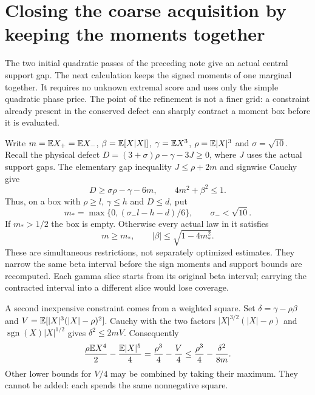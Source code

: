 \section{Closing the coarse acquisition by keeping the moments together}
\label{v7:signed}
The two initial quadratic passes of the preceding note give an actual
central support gap. The next calculation keeps the signed moments of
one marginal together. It requires no unknown extremal score and uses
only the simple quadratic phase price. The point of the refinement is
not a finer grid: a constraint already present in the conserved defect
can sharply contract a moment box before it is evaluated.

Write $m=\mathbb E X_+=\mathbb E X_-$, $\beta=\mathbb E[X|X|]$, $\gamma=\mathbb E X^3$,
$\rho=\mathbb E|X|^3$ and $\sigma=\sqrt{10}$. Recall the physical defect
$D=(3+\sigma)\rho-\gamma-3J\ge0$, where $J$ uses the actual support gaps.
The elementary gap inequality $J\le\rho+2m$ and signwise Cauchy give
\begin{equation}\label{v7:coupled}
 D\ge\sigma\rho-\gamma-6m,\qquad
 4m^2+\beta^2\le1.
\end{equation}
Thus, on a box with $\rho\ge l$, $\gamma\le h$ and $D\le d$, put
\[
 m_* =\max\{0,(\sigma_-l-h-d)/6\},\qquad \sigma_-<\sqrt{10}.
\]
If $m_*>1/2$ the box is empty. Otherwise every actual law in it satisfies
\begin{equation}\label{v7:contract}
 m\ge m_*,\qquad |\beta|\le\sqrt{1-4m_*^2}.
\end{equation}
These are simultaneous restrictions, not separately optimized estimates.
They narrow the same beta interval before the sign moments and support
bounds are recomputed. Each gamma slice starts from its original beta
interval; carrying the contracted interval into a different slice would
lose coverage.

A second inexpensive constraint comes from a weighted square. Set
$\delta=\gamma-\rho\beta$ and
$V=\mathbb E[|X|^3(|X|-\rho)^2]$. Cauchy with the two factors
$|X|^{3/2}(|X|-\rho)$ and $\operatorname{sgn}(X)|X|^{1/2}$ gives
$\delta^2\le2mV$. Consequently
\begin{equation}\label{v7:quarter}
 \frac{\rho\mathbb E X^4}{2}-\frac{\mathbb E|X|^5}{4}
 =\frac{\rho^3}{4}-\frac V4
 \le\frac{\rho^3}{4}-\frac{\delta^2}{8m}.
\end{equation}
Other lower bounds for $V/4$ may be combined by taking their maximum.
They cannot be added: each spends the same nonnegative square.

